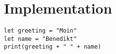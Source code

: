 \chapter{Implementation}


\begin{lstlisting}[style=swift, caption={Swift example}]
let greeting = "Moin"
let name = "Benedikt"
print(greeting + " " + name)
\end{lstlisting}
